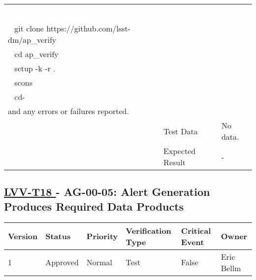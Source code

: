 \begin{longtable}[]{p{1.3cm}p{2cm}p{13cm}}
\begin{minipage}[t]{13cm}
{\hspace*{0.333em} ~ cd-\\
\hspace*{0.333em} ~\\
\hspace*{0.333em} ~ git clone https://github.com/lsst-dm/ap\_verify\\
\hspace*{0.333em} ~ cd ap\_verify\\
\hspace*{0.333em} ~ setup -k -r .\\
\hspace*{0.333em} ~ scons\\
\hspace*{0.333em} ~ cd-\\[2\baselineskip]and any errors or failures
reported.
 
\vspace{\dp0}
} \end{minipage} \\ \cline{2-3}
& Test Data & 
\begin{minipage}[t]{13cm}{\footnotesize

No data. 
\vspace{\dp0}

} \end{minipage} \\ \cline{2-3}
& Expected Result &

\begin{minipage}[t]{13cm}{\footnotesize
-
\vspace{\dp0}
} \end{minipage} 


\\ \midrule

\end{longtable}




\subsection{ \href{https://jira.lsstcorp.org/secure/Tests.jspa\#/testCase/LVV-T18}{ LVV-T18 }
             - AG-00-05: Alert Generation Produces Required Data Products }\label{lvv-t18}





\begin{longtable}[]{llllll}
\toprule
Version & Status & Priority & Verification Type & Critical Event & Owner
\\\midrule
1 & Approved & Normal & Test & False & Eric Bellm
\\\bottomrule
\end{longtable}

